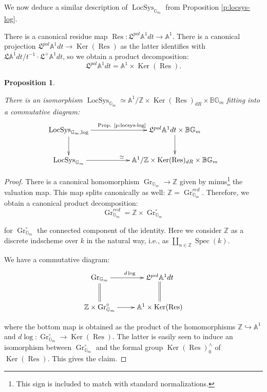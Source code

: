 \documentclass[reqno,11pt]{amsart}
\numberwithin{equation}{subsection}
\newtheorem{prop}[thm]{Proposition}
\theoremstyle{remark}
\newcommand{\into}{\hookrightarrow}
\newcommand{\bA}{{\mathbb A}}
\newcommand{\bB}{{\mathbb B}}
\newcommand{\bG}{{\mathbb G}}
\newcommand{\bZ}{{\mathbb Z}}
\newcommand{\fL}{{\mathfrak L}}
\newcommand{\on}{\operatorname}
\newcommand{\Ker}{\on{Ker}}
\newcommand{\Spec}{\on{Spec}}
\newcommand{\Res}{\on{Res}}
\newcommand{\Gr}{\on{Gr}}
\newcommand{\LocSys}{\on{LocSys}}
\begin{document}
\subsubsection{}

We now deduce a similar description of $\LocSys_{\bG_m}$
from Proposition \ref{p:locsys-log}.

There is a canonical residue map 
$\Res:\fL^{pol} \bA^1 dt \to \bA^1$. There is a canonical projection
$\fL^{pol} \bA^1 dt \to \Ker(\Res)$ as the latter identifies
with $\fL \bA^1 dt/t^{-1} \cdot \fL^+ \bA^1 dt$,
so we obtain a product decomposition:
%
\[
\fL^{pol} \bA^1 dt = \bA^1 \times \Ker(\Res).
\]

\begin{prop}\label{p:locsys}

There is an isomorphism $\LocSys_{\bG_m} \simeq 
\bA^1/\bZ \times \Ker(\Res)_{dR} \times \bB \bG_m$ fitting
into a commutative diagram:
%
\[
\xymatrix{
\LocSys_{\bG_m,\log} \ar[rr]^{\text{Prop. \ref{p:locsys-log}}} 
\ar[d] & & \fL^{pol} \bA^1 dt \times \bB \bG_m \ar[d] \\
\LocSys_{\bG_m} \ar[rr]^{\simeq}
& &
\bA^1/\bZ \times \Ker(\Res)_{dR} \times \bB \bG_m
}
\]

\end{prop}

\begin{proof}

There is a canonical homomorphism
$\Gr_{\bG_m} \to \bZ$ given by minus\footnote{This sign is included to match
with standard normalizations.} the valuation map. This map splits 
canonically as well: $\bZ = \Gr_{\bG_m}^{red}$.
Therefore, we obtain a canonical product decomposition:
%
\[
\Gr_{\bG_m}^{red} = \bZ \times \Gr_{\bG_m}^{\circ}
\]

\noindent for $\Gr_{\bG_m}^{\circ}$ the connected component
of the identity. Here we consider $\bZ$ as a discrete indscheme
over $k$ in the natural way, i.e., as $\coprod_{n \in \bZ} \Spec(k)$.

We have a commutative diagram:
%
\[
\xymatrix{
\Gr_{\bG_m} \ar[r]^{d\log} \ar@{=}[d] & 
\fL^{pol} \bA^1 dt \ar@{=}[d] \\
\bZ \times \Gr_{\bG_m}^{\circ} \ar[r] 
& \bA^1 \times \Ker(\Res) 
}
\]

\noindent where the bottom map is obtained as the product
of the homomorphisms $\bZ \into \bA^1$ and 
$d\log:\Gr_{\bG_m}^{\circ} \to \Ker(\Res)$. The latter
is easily seen to induce an isomorphism between
$\Gr_{\bG_m}^{\circ}$ and the formal group 
$\Ker(\Res)_0^{\wedge}$ of $\Ker(\Res)$. This gives the claim.

\end{proof}
\end{document}
